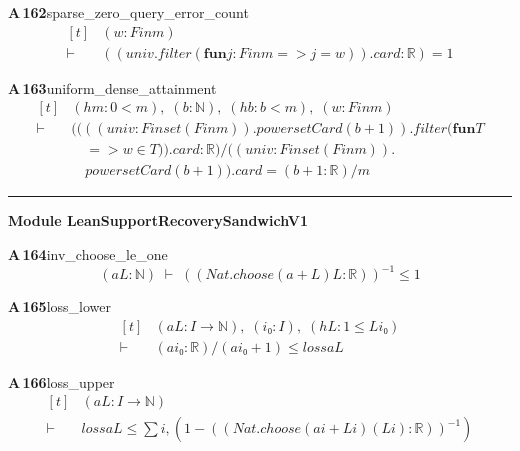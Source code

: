 \documentclass[conference]{IEEEtran}
\theoremstyle{definition}
\newcommand{\lean}[1]{\textsf{\footnotesize #1}}
\begin{document}
\noindent\textbf{A\,162}\quad\lean{sparse\_zero\_query\_error\_count}
{\footnotesize\[ \begin{aligned}[t]
&(\mathit{w} : \mathit{Fin} \mathit{m})\\
\vdash\;&((\mathit{univ}.\mathit{filter} (\mathbf{fun} \mathit{j} : \mathit{Fin} \mathit{m} => \mathit{j} = \mathit{w})).\mathit{card} : \mathbb{R} ) = 1
\end{aligned} \]}

\noindent\textbf{A\,163}\quad\lean{uniform\_dense\_attainment}
{\footnotesize\[ \begin{aligned}[t]
&(\mathit{hm} : 0 < \mathit{m}),\; (\mathit{b} : \mathbb{N} ),\; (\mathit{hb} : \mathit{b} < \mathit{m}),\; (\mathit{w} : \mathit{Fin} \mathit{m})\\
\vdash\;&((((\mathit{univ} : \mathit{Finset} (\mathit{Fin} \mathit{m})).\mathit{powersetCard} (\mathit{b}+1)).\mathit{filter} (\mathbf{fun} \mathit{T}\\
&\quad => \mathit{w} \in \mathit{T})).\mathit{card} : \mathbb{R} ) / ((\mathit{univ} : \mathit{Finset} (\mathit{Fin} \mathit{m})).\\
&\quad \mathit{powersetCard} (\mathit{b}+1)).\mathit{card} = (\mathit{b}+1 : \mathbb{R} )/\mathit{m}
\end{aligned} \]}

\vspace{4pt}\noindent\rule{\columnwidth}{0.4pt}\par\vspace{2pt}
\noindent\textbf{Module \lean{LeanSupportRecoverySandwichV1}}\par\vspace{3pt}

\noindent\textbf{A\,164}\quad\lean{inv\_choose\_le\_one}
{\footnotesize\[ (\mathit{a} \mathit{L} : \mathbb{N} ) \;\vdash\; ((\mathit{Nat}.\mathit{choose} (\mathit{a} + \mathit{L}) \mathit{L} : \mathbb{R} ))^{-1} \leq 1 \]}

\noindent\textbf{A\,165}\quad\lean{loss\_lower}
{\footnotesize\[ \begin{aligned}[t]
&(\mathit{a} \mathit{L} : \mathit{I} \to \mathbb{N} ),\; (\mathit{i₀} : \mathit{I}),\; (\mathit{hL} : 1 \leq \mathit{L} \mathit{i₀})\\
\vdash\;&(\mathit{a} \mathit{i₀} : \mathbb{R} ) / (\mathit{a} \mathit{i₀} + 1) \leq \mathit{loss} \mathit{a} \mathit{L}
\end{aligned} \]}

\noindent\textbf{A\,166}\quad\lean{loss\_upper}
{\footnotesize\[ \begin{aligned}[t]
&(\mathit{a} \mathit{L} : \mathit{I} \to \mathbb{N} )\\
\vdash\;&\mathit{loss} \mathit{a} \mathit{L} \leq \textstyle\sum \mathit{i}, (1 - ((\mathit{Nat}.\mathit{choose} (\mathit{a} \mathit{i} + \mathit{L} \mathit{i}) (\mathit{L} \mathit{i}) : \mathbb{R} ))^{-1} )
\end{aligned} \]}
\end{document}
